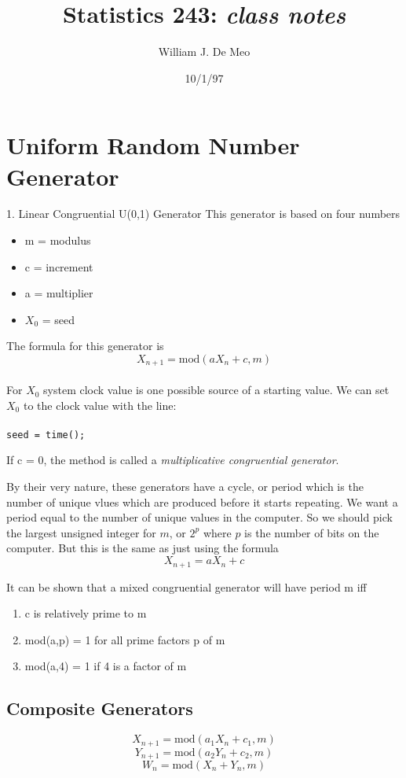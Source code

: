 \documentclass{article}
\begin{document}
\title{Statistics 243: \emph{class notes}}
\author{William J. De Meo}
\date{10/1/97 }
\maketitle
\section{Uniform Random Number Generator}
1. Linear Congruential U(0,1) Generator
This generator is based on four numbers
\begin{itemize}
\item m = modulus 
\item c = increment
\item a = multiplier
\item $X_0$ = seed
\end{itemize}

The formula for this generator is \\
\[
X_{n+1} = \mbox{mod}(aX_n + c, m)
\]
\\
For $X_0$ system clock value is one possible source of a starting value. 
We can set $X_0$ to the clock value with the line:\\\\
{\tt seed = time();}

If c = 0, the method is called a \emph{multiplicative congruential generator}.

By their very nature, these generators have a cycle, or period 
which is the number of unique vlues which are produced 
before it starts repeating.  We want a period equal to the number
of unique values in the computer.  So we should pick the largest
unsigned integer for $m$, or $2^p$ where $p$ is the number of bits on the 
computer.  But this is the same as just using the formula
\[X_{n+1} = aX_n + c \]

It can be shown that a mixed congruential generator will have period m
iff 
\begin{enumerate}
\item c is relatively prime to m 
\item mod(a,p) = 1 for all prime factors p of m 
\item mod(a,4) = 1 if 4 is a factor of m 
\end{enumerate}

\subsection{Composite Generators}
\[X_{n+1} = \mbox{mod}(a_1 X_n + c_1 , m)\]
\[Y_{n+1} = \mbox{mod}(a_2 Y_n +c_2, m)\]
\[W_n = \mbox{mod}(X_n + Y_n, m)\]
\end{document}
